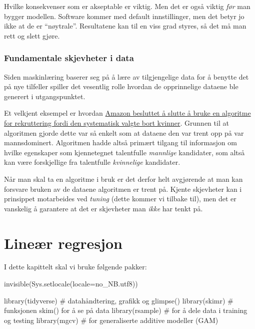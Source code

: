 \documentclass[
  letterpaper,
  DIV=11,
  numbers=noendperiod]{scrreprt}
\newenvironment{Shaded}{\begin{snugshade}}{\end{snugshade}}
\newcommand{\AttributeTok}[1]{\textcolor[rgb]{0.40,0.45,0.13}{#1}}
\newcommand{\CommentTok}[1]{\textcolor[rgb]{0.37,0.37,0.37}{#1}}
\newcommand{\FunctionTok}[1]{\textcolor[rgb]{0.28,0.35,0.67}{#1}}
\newcommand{\NormalTok}[1]{\textcolor[rgb]{0.00,0.23,0.31}{#1}}
\newcommand{\StringTok}[1]{\textcolor[rgb]{0.13,0.47,0.30}{#1}}
\begin{document}
Hvilke konsekvenser som er akseptable er viktig. Men det er også viktig
\emph{før} man bygger modellen. Software kommer med default
innstillinger, men det betyr jo ikke at de er ``nøytrale''. Resultatene
kan til en viss grad styres, så det må man rett og slett gjøre.

\subsection{Fundamentale skjevheter i
data}\label{fundamentale-skjevheter-i-data}

Siden maskinlæring baserer seg på å lære av tilgjengelige data for å
benytte det på nye tilfeller spiller det vesentlig rolle hvordan de
opprinnelige dataene ble generert i utgangspunktet.

Et velkjent eksempel er hvordan
\href{https://www.reuters.com/article/us-amazon-com-jobs-automation-insight-idUSKCN1MK08G}{Amazon
besluttet å slutte å bruke en algoritme for rekruttering fordi den
systematisk valgte bort kvinner}. Grunnen til at algoritmen gjorde dette
var så enkelt som at dataene den var trent opp på var mannsdominert.
Algoritmen hadde altså primært tilgang til informasjon om hvilke
egenskaper som kjennetegnet talentfulle \emph{mannlige} kandidater, som
altså kan være forskjellige fra talentfulle \emph{kvinnelige}
kandidater.

Når man skal ta en algoritme i bruk er det derfor helt avgjørende at man
kan forsvare bruken av de dataene algoritmen er trent på. Kjente
skjevheter kan i prinsippet motarbeides ved \emph{tuning} (dette kommer
vi tilbake til), men det er vanskelig å garantere at det er skjevheter
man \emph{ikke} har tenkt på.


\chapter{Lineær regresjon}\label{lineuxe6r-regresjon}

I dette kapittelt skal vi bruke følgende pakker:

\begin{Shaded}
\begin{Highlighting}[]
\FunctionTok{invisible}\NormalTok{(}\FunctionTok{Sys.setlocale}\NormalTok{(}\AttributeTok{locale=}\StringTok{\textquotesingle{}no\_NB.utf8\textquotesingle{}}\NormalTok{))}

\FunctionTok{library}\NormalTok{(tidyverse)   }\CommentTok{\# datahåndtering, grafikk og glimpse()}
\FunctionTok{library}\NormalTok{(skimr)       }\CommentTok{\# funksjonen skim() for å se på data}
\FunctionTok{library}\NormalTok{(rsample)     }\CommentTok{\# for å dele data i training og testing}
\FunctionTok{library}\NormalTok{(mgcv)        }\CommentTok{\# for generaliserte additive modeller (GAM)}
\end{Highlighting}
\end{Shaded}
\end{document}
